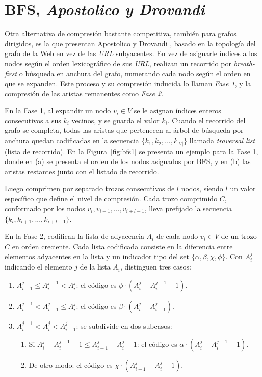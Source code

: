 \section{BFS, \textit{Apostolico y Drovandi}}
Otra alternativa de compresión bastante competitiva, también para grafos dirigidos, es la que presentan Apostolico y Drovandi \cite{apostolico2009graph}, basado en la topología del grafo de la Web en vez de las \textit{URL} subyacentes. En vez de asignarle índices a los nodos según el orden lexicográfico de sus \textit{URL}, realizan un recorrido por \textit{breath-first} o búsqueda en anchura del grafo, numerando cada nodo según el orden en que se expanden. Este proceso y su compresión inducida lo llaman \textit{Fase 1}, y la compresión de las aristas remanentes como \textit{Fase 2}.

En la Fase 1, al expandir un nodo $v_{i} \in V$ se le asignan índices enteros consecutivos a sus $k_{i}$ vecinos, y se guarda el valor $k_{i}$. Cuando el recorrido del grafo se completa, todas las aristas que pertenecen al árbol de búsqueda por anchura quedan codificadas en la secuencia $\{k_{1}, k_{2}, ..., k_{|V|}\}$ llamada \textit{traversal list} (lista de recorrido). En la Figura~\ref{fig:bfs1} se presenta un ejemplo para la Fase 1, donde en (a) se presenta el orden de los nodos asignados por BFS, y en (b) las aristas restantes junto con el listado de recorrido.



Luego comprimen por separado trozos consecutivos de $l$ nodos, siendo $l$ un valor específico que define el nivel de compresión. Cada trozo comprimido $C$, conformado por los nodos $v_{i}, v_{i + 1}, ..., v_{i + l - 1}$, lleva prefijado la secuencia $\{k_{i}, k_{i + 1}, ..., k_{i + l - 1}\}$.

En la Fase 2, codifican la lista de adyacencia $A_{i}$ de cada nodo $v_{i} \in V$ de un trozo $C$ en orden creciente. Cada lista codificada consiste en la diferencia entre elementos adyacentes en la lista y un indicador tipo del set $\{\alpha, \beta, \chi, \phi\}$. Con $A_{i}^{j}$ indicando el elemento $j$ de la lista $A_{i}$, distinguen tres casos:

\begin{enumerate}
	\item $A_{i - 1}^{j} \leq A_{i}^{j - 1} < A_{i}^{j}$: el código es $\phi \cdot (A_{i}^{j} - A_{i}^{j - 1} - 1)$.
	\item $A_{i}^{j - 1} < A_{i - 1}^{j} \leq A_{i}^{j}$: el código es $\beta \cdot (A_{i}^{j} - A_{i - 1}^{j})$.
	\item $A_{i}^{j - 1} < A_{i}^{j} < A_{i - 1}^{j}$: se subdivide en dos subcasos:
	\begin{enumerate}
		\item Si $A_{i}^{j} - A_{i}^{j - 1} - 1 \leq A_{i - 1}^{j} - A_{i}^{j} - 1$: el código es $\alpha \cdot (A_{i}^{j} - A_{i}^{j - 1} - 1)$.
		\item De otro modo: el código es $\chi \cdot (A_{i - 1}^{j} - A_{i}^{j} - 1)$.
	\end{enumerate}
\end{enumerate}

